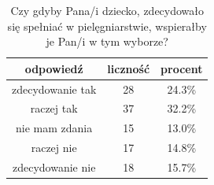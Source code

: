 \documentclass[a4paper,12pt,twoside,openany]{report}
\begin{document}
\begin{table}[h]
\caption{Czy gdyby Pana/i dziecko, zdecydowało się spełniać w pielęgniarstwie, wspierałby je Pan/i w tym wyborze?}
\centering
\begin{tabular}{ | c | c | c |}
\hline
odpowiedź & liczność & procent\\
\hline
zdecydowanie tak  &  28  & 24.3\% \\
\hline
raczej tak  &  37  & 32.2\% \\
\hline
nie mam zdania  &  15  & 13.0\% \\
\hline
raczej nie  &  17  & 14.8\% \\
\hline
zdecydowanie nie  &  18  & 15.7\% \\
\hline
\end{tabular}
\label{tab:Q37}
\end{table}







\zakonczenie  %
\end{document}
